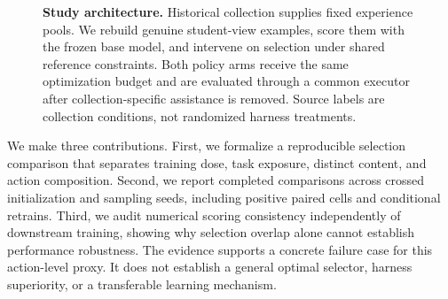 \begin{figure}[t]
  \centering
  \resizebox{\linewidth}{!}{}
  \caption{\textbf{Study architecture.} Historical collection supplies fixed experience pools. We rebuild genuine student-view examples, score them with the frozen base model, and intervene on selection under shared reference constraints. Both policy arms receive the same optimization budget and are evaluated through a common executor after collection-specific assistance is removed. Source labels are collection conditions, not randomized harness treatments.}
  \label{fig:architecture}
\end{figure}

We make three contributions. First, we formalize a reproducible selection comparison that separates training dose, task exposure, distinct content, and action composition. Second, we report completed comparisons across crossed initialization and sampling seeds, including positive paired cells and conditional retrains. Third, we audit numerical scoring consistency independently of downstream training, showing why selection overlap alone cannot establish performance robustness. The evidence supports a concrete failure case for this action-level proxy. It does not establish a general optimal selector, harness superiority, or a transferable learning mechanism.


